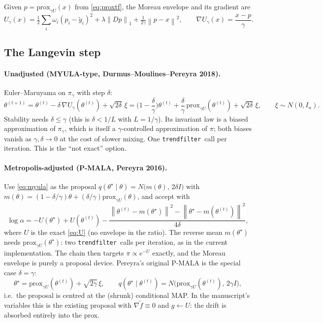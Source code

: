 \documentclass[12pt]{article}
\newcommand{\norm}[1]{\left\lVert#1\right\rVert}
\newcommand{\prox}{\mathrm{prox}}
\newcommand{\tf}{\texttt{trendfilter}}
\begin{document}
Given $p=\prox_{\gamma U}(x)$ from \eqref{eq:proxtf}, the Moreau envelope and its gradient are
\begin{equation}
    U_\gamma(x)=\tfrac12\sum_i\omega_i(p_i-\tilde y_i)^2+\lambda\norm{Dp}_1+\tfrac1{2\gamma}\norm{p-x}^2,
    \qquad \nabla U_\gamma(x)=\frac{x-p}{\gamma}.
    \label{eq:moreau_explicit}
\end{equation}

\subsection{The Langevin step}

\paragraph{Unadjusted (MYULA-type, Durmus--Moulines--Pereyra 2018).}
Euler--Maruyama on $\pi_\gamma$ with step $\delta$:
\begin{equation}
    \theta^{(t+1)}=\theta^{(t)}-\delta\,\nabla U_\gamma(\theta^{(t)})+\sqrt{2\delta}\,\xi
    =\Big(1-\frac\delta\gamma\Big)\theta^{(t)}+\frac\delta\gamma\,\prox_{\gamma U}(\theta^{(t)})+\sqrt{2\delta}\,\xi,
    \qquad \xi\sim N(0,I_n).
    \label{eq:myula}
\end{equation}
Stability needs $\delta\le\gamma$ (this is $\delta<1/L$ with $L=1/\gamma$). Its invariant law is
a biased approximation of $\pi_\gamma$, which is itself a $\gamma$-controlled approximation of
$\pi$; both biases vanish as $\gamma,\delta\to0$ at the cost of slower mixing. One
\tf\ call per iteration. This is the ``not exact'' option.

\paragraph{Metropolis-adjusted (P-MALA, Pereyra 2016).}
Use \eqref{eq:myula} as the proposal $q(\theta^\star\mid\theta)=N\big(m(\theta),\,2\delta I\big)$ with
$m(\theta)=(1-\delta/\gamma)\theta+(\delta/\gamma)\prox_{\gamma U}(\theta)$, and accept with
\begin{equation}
    \log\alpha=-U(\theta^\star)+U(\theta^{(t)})
    -\frac{\norm{\theta^{(t)}-m(\theta^\star)}^2-\norm{\theta^\star-m(\theta^{(t)})}^2}{4\delta},
    \label{eq:mh}
\end{equation}
where $U$ is the exact \eqref{eq:U} (no envelope in the ratio). The reverse mean $m(\theta^\star)$
needs $\prox_{\gamma U}(\theta^\star)$: two \tf\ calls per iteration, as in the current
implementation. The chain then targets $\pi\propto e^{-U}$ exactly, and the Moreau envelope is
purely a proposal device. Pereyra's original P-MALA is the special case $\delta=\gamma$:
\begin{equation}
    \theta^\star=\prox_{\gamma U}(\theta^{(t)})+\sqrt{2\gamma}\,\xi,\qquad
    q(\theta^\star\mid\theta^{(t)})=N\big(\prox_{\gamma U}(\theta^{(t)}),\,2\gamma I\big),
    \label{eq:pmala}
\end{equation}
i.e.\ the proposal is centred at the (shrunk) conditional MAP. In the manuscript's variables
this is the existing proposal with $\nabla\tilde f\equiv0$ and $g\leftarrow U$: the drift is
absorbed entirely into the prox.
\end{document}
